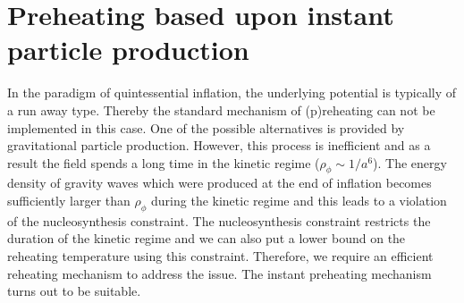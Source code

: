 \documentclass[prd,twocolumn,superscriptaddress]{revtex4}
\begin{document}
\section{Preheating based upon instant particle production}
In the paradigm of quintessential inflation, the underlying potential is typically of a run away type. Thereby the standard mechanism of (p)reheating\cite{LDH,BPS,Starobinsky,Starobinsky2} can not be implemented in this case. One
of the possible alternatives is provided by gravitational particle production. However, this process is inefficient and as a result the field spends a 
long time in the kinetic regime ($\rho_\phi\sim 1/a^6$). The energy density of gravity waves which were produced at the end of
inflation becomes sufficiently larger than  $\rho_\phi$ during the kinetic regime and this leads to a violation of the nucleosynthesis constraint. The nucleosynthesis 
constraint restricts the duration of the kinetic regime and we can also put a lower bound on the  reheating
temperature using this constraint. Therefore, we require an efficient reheating mechanism to address the issue. The instant 
preheating mechanism turns out to be suitable. 
\end{document}
